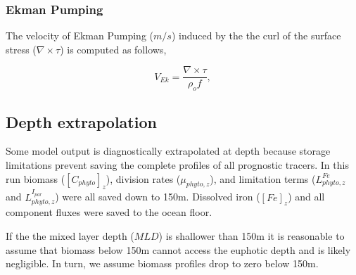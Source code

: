 \documentclass{article}
\begin{document}
\subsubsection{Ekman Pumping}

The velocity of Ekman Pumping ($m/s$) induced by the the curl of the surface stress ($ \nabla \times \tau$) is computed as follows,

\begin{equation}
    V_{Ek}  = \frac{\nabla \times \tau}{\rho_o f},
\end{equation}





\subsection{Depth extrapolation}

Some model output is diagnostically extrapolated at depth because storage limitations prevent saving the complete profiles of all prognostic tracers. In this run biomass ($[C_{phyto}]_z$), division rates ($\mu_{phyto, z}$), and limitation terms ($L^{Fe}_{phyto, z}$ and $L^{I_{par}}_{phyto, z}$) were all saved down to 150m. Dissolved iron ($[Fe]_z$) and all component fluxes were saved to the ocean floor. 

If the the mixed layer depth ($MLD$) is shallower than 150m it is reasonable to assume that biomass below 150m cannot access the euphotic depth and is likely negligible. In turn, we assume biomass profiles drop to zero below 150m.
\end{document}
